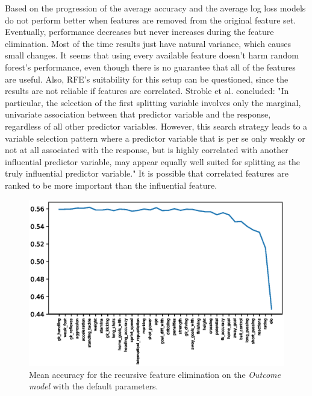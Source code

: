 Based on the progression of the average accuracy and the average log loss models do not perform better when features are removed from the original feature set. Eventually, performance decreases but never increases during the feature elimination. Most of the time results just have natural variance, which causes small changes. It seems that using every available feature doesn't harm random forest's performance, even though there is no guarantee that all of the features are useful. Also, RFE's suitability for this setup can be questioned, since the results are not reliable if features are correlated. Stroble et al. concluded: "In particular, the selection of the first splitting variable involves only the marginal, univariate association between that predictor variable and the response, regardless of all other predictor variables. However, this search strategy leads to a variable selection pattern where a predictor variable that is per se only weakly or not at all associated with the response, but is highly correlated with another influential predictor variable, may appear equally well suited for splitting as the truly influential predictor variable." It is possible that correlated features are ranked to be more important than the influential feature.
\begin{figure}[H]
    \centering
    \includegraphics[width=1\textwidth]{img/default_avg_accuracy.eps}
    \caption{Mean accuracy for the recursive feature elimination on the \textit{Outcome model} with the default parameters.}
    \label{fig:def_avg_accu}
\end{figure}


